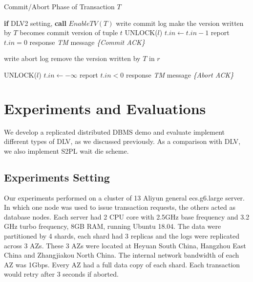 \documentclass[conference]{IEEEtran}
\begin{document}
\begin{algorithm}[!h]
  \caption{Commit/Abort Phase of Transaction ${T}$}
  \begin{algorithmic}[1]
    \State \textbf{if} DLV2 setting, \textbf{call} ${EnableTV(T)}$ 
    \State write commit log
      \State make the version written by ${T}$ becomes commit version of tuple ${t}$ 
    \EndFor
      \State UNLOCK(${l}$)
    \EndFor
      \State ${t.in \gets t.in - 1}$ 
        \State report ${t.in = 0}$ 
      \EndIf
    \EndFor
    \State response \emph{TM} message \emph{\{Commit ACK\}}
    \label{func:commit}
  \EndFunction
  \end{algorithmic}
  \begin{algorithmic}[1]
  \State write abort log
    \State remove the version written by ${T}$ in ${r}$
\EndFor

      \State UNLOCK(${l}$)
    \EndFor
      \State ${t.in \gets -\infty }$
      \State report ${t.in < 0}$ 
    \EndFor
    \State response \emph{TM} message \emph{\{Abort ACK\}}
    \label{func:abort}
  \EndFunction
  \end{algorithmic}

  \label{alg:commit_phase}
\end{algorithm}

\section{Experiments and Evaluations}
\label{sec:experiments}
We develop a replicated distributed DBMS demo and evaluate implement different types of DLV, as we discussed previously.
As a comparison with DLV, we also implement S2PL wait die scheme.

\subsection{Experiments Setting}
Our experiments performed on a cluster of 13 Aliyun general ecs.g6.large server.
In which one node was used to issue transaction requests, the others acted as database nodes.
Each server had 2 CPU core with 2.5GHz
base frequency and 3.2 GHz turbo frequency, 8GB RAM, running Ubuntu 18.04.
The data were partitioned by 4 shards, each shard had 3 replicas and the logs were replicated across 3 AZs.
These 3 AZs were located at Heyuan South China, Hangzhou East China and Zhangjiakou North China.
The internal network bandwidth of each AZ was 1Gbps.
Every AZ had a full data copy of each shard.
Each transaction would retry after 3 seconds if aborted.
\end{document}
